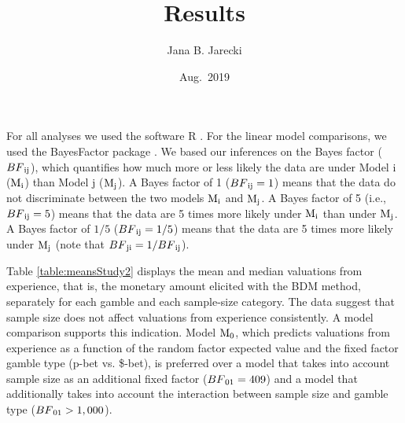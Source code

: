 \documentclass[]{standalone}
\title{Results}
\author{Jana B. Jarecki}
\date{Aug.~2019}
\begin{document}
\maketitle

For all analyses we used the software R \citep{R2019}. For the linear
model comparisons, we used the BayesFactor package \citep{BayesFactor}.
We based our inferences on the Bayes factor (\(BF\textsubscript{ij}\)),
which quantifies how much more or less likely the data are under Model i
(\(\mathrm{M}\textsubscript{i}\)) than Model j
(\(\mathrm{M}\textsubscript{j}\)). A Bayes factor of 1
(\(BF\textsubscript{ij} = 1\)) means that the data do not discriminate
between the two models \(\mathrm{M}\textsubscript{i}\) and
\(\mathrm{M}\textsubscript{j}\). A Bayes factor of 5 (i.e.,
\(BF\textsubscript{ij} = 5\)) means that the data are 5 times more
likely under \(\mathrm{M}\textsubscript{i}\) than under
\(\mathrm{M}\textsubscript{j}\). A Bayes factor of \(1/5\)
(\(BF\textsubscript{ij} = 1/5\)) means that the data are 5 times more
likely under \(\mathrm{M}\textsubscript{j}\) (note that
\(BF\textsubscript{ji} = 1/BF\textsubscript{ij}\)).

Table \ref{table:meansStudy2} displays the mean and median valuations
from experience, that is, the monetary amount elicited with the BDM
method, separately for each gamble and each sample-size category. The
data suggest that sample size does not affect valuations from experience
consistently. A model comparison supports this indication. Model
\(\mathrm{M}\textsubscript{0}\), which predicts valuations from
experience as a function of the random factor expected value and the
fixed factor gamble type (p-bet vs. \$-bet), is preferred over a model
that takes into account sample size as an additional fixed factor
(\(BF\textsubscript{01} = 409\)) and a model that additionally takes
into account the interaction between sample size and gamble type
(\(BF\textsubscript{01} > 1,000\)).
\end{document}
